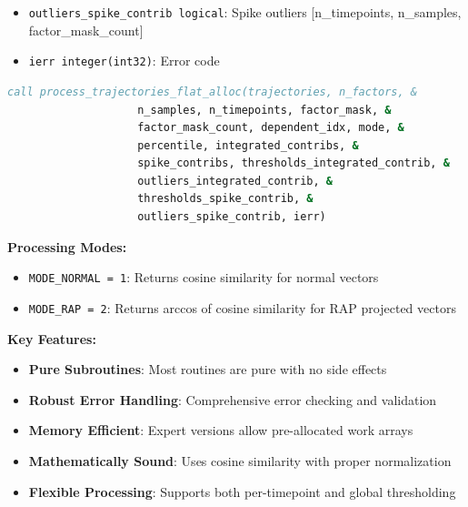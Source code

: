 \documentclass[11pt]{article}
\begin{document}
\begin{enumerate}
\begin{enumerate}
\begin{itemize}
	      	      	\item \texttt{outliers\_spike\_contrib logical}: Spike outliers [n\_timepoints,
	      	      	n\_samples, factor\_mask\_count]
	      	      	
	      	      	\item \texttt{ierr integer(int32)}: Error code
	      	      \end{itemize}
	      	      \begin{lstlisting}[language=Fortran, caption={Complete Pipeline with Global Threshold}]
call process_trajectories_flat_alloc(trajectories, n_factors, & 
                    n_samples, n_timepoints, factor_mask, &
                    factor_mask_count, dependent_idx, mode, &
                    percentile, integrated_contribs, &
                    spike_contribs, thresholds_integrated_contrib, &
                    outliers_integrated_contrib, &
                    thresholds_spike_contrib, &
                    outliers_spike_contrib, ierr)
	      	      \end{lstlisting}
	      \end{enumerate}
	      
	      \textbf{Processing Modes:}
	      \begin{itemize}
	      	\item \texttt{MODE\_NORMAL = 1}: Returns cosine similarity for normal vectors
	      	      
	      	\item \texttt{MODE\_RAP = 2}: Returns arccos of cosine similarity for RAP
	      	      projected vectors
	      \end{itemize}
	      
	      \textbf{Key Features:}
	      \begin{itemize}
	      	\item \textbf{Pure Subroutines}: Most routines are pure with no side effects
	      	      
	      	\item \textbf{Robust Error Handling}: Comprehensive error checking and validation
	      	      
	      	\item \textbf{Memory Efficient}: Expert versions allow pre-allocated work
	      	      arrays
	      	      
	      	\item \textbf{Mathematically Sound}: Uses cosine similarity with proper normalization
	      	      
	      	\item \textbf{Flexible Processing}: Supports both per-timepoint and global
	      	      thresholding
	      \end{itemize}
\end{enumerate}
\end{document}
